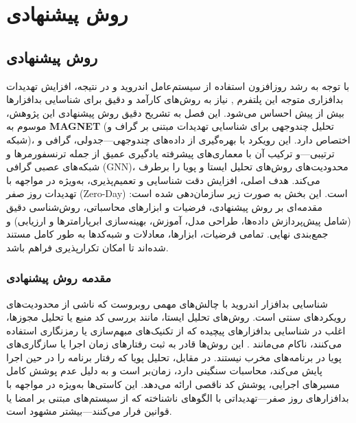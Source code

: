 \clearpage
\thispagestyle{empty}
\chapter{روش پیشنهادی}\label{chap4}

\section{روش پیشنهادی}

با توجه به رشد روزافزون استفاده از سیستم‌عامل اندروید  و در نتیجه، افزایش تهدیدات بدافزاری متوجه این پلتفرم \cite{AndroidSecurity}, نیاز به روش‌های کارآمد و دقیق برای شناسایی بدافزارها بیش از پیش احساس می‌شود. این فصل به تشریح دقیق روش پیشنهادی این پژوهش، موسوم به \textbf{MAGNET} (تحلیل چندوجهی برای شناسایی تهدیدات مبتنی بر گراف و شبکه)، اختصاص دارد. این رویکرد با بهره‌گیری از داده‌های چندوجهی—جدولی، گرافی و ترتیبی—و ترکیب آن با معماری‌های پیشرفته یادگیری عمیق از جمله ترنسفورمرها و شبکه‌های عصبی گرافی (GNN)، محدودیت‌های روش‌های تحلیل ایستا و پویا را برطرف می‌کند. هدف اصلی، افزایش دقت شناسایی و تعمیم‌پذیری، به‌ویژه در مواجهه با تهدیدات روز صفر (Zero-Day) است. این بخش به صورت زیر سازمان‌دهی شده است: مقدمه‌ای بر روش پیشنهادی، فرضیات و ابزارهای محاسباتی، روش‌شناسی دقیق (شامل پیش‌پردازش داده‌ها، طراحی مدل، آموزش، بهینه‌سازی ابرپارامترها و ارزیابی) و جمع‌بندی نهایی. تمامی فرضیات، ابزارها، معادلات و شبه‌کدها به طور کامل مستند شده‌اند تا امکان تکرارپذیری فراهم باشد.

\subsection{مقدمه روش پیشنهادی}

شناسایی بدافزار اندروید با چالش‌های مهمی روبروست که ناشی از محدودیت‌های رویکردهای سنتی است. روش‌های تحلیل ایستا، مانند بررسی کد منبع یا تحلیل مجوزها، اغلب در شناسایی بدافزارهای پیچیده که از تکنیک‌های مبهم‌سازی یا رمزنگاری استفاده می‌کنند، ناکام می‌مانند \cite{Drebin}. این روش‌ها قادر به ثبت رفتارهای زمان اجرا یا سازگاری‌های پویا در برنامه‌های مخرب نیستند. در مقابل، تحلیل پویا که رفتار برنامه را در حین اجرا پایش می‌کند، محاسبات سنگینی دارد، زمان‌بر است و به دلیل عدم پوشش کامل مسیرهای اجرایی، پوشش کد ناقصی ارائه می‌دهد. این کاستی‌ها به‌ویژه در مواجهه با بدافزارهای روز صفر—تهدیداتی با الگوهای ناشناخته که از سیستم‌های مبتنی بر امضا یا قوانین فرار می‌کنند—بیشتر مشهود است.

